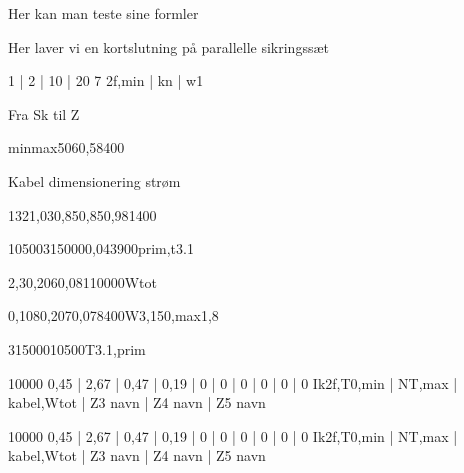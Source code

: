 \documentclass[a4paper,oneside,10pt,danish]{report}
\begin{document}
Her kan man teste sine formler

 
 Her laver vi en kortslutning på parallelle sikringssæt
	\begin{LV-Ik2f,parSikr-kA}
		{ 1 | 2 | 10 | 20 }
		{7}
		{2f,min | kn | w1}
	\end{LV-Ik2f,parSikr-kA} 
 
 
Fra Sk til Z
\begin{FraSkTilZ}{min}{max}{50}{6}{0,58}{400}
\end{FraSkTilZ}

Kabel dimensionering strøm
\begin{Iz,min}{132}{1,03}{0,85}{0,85}{0,98}{1}{400}
\end{Iz,min}

\begin{Ztrafo}{10500}{315000}{0,04}{3900}{prim,t3.1}
\end{Ztrafo}

\begin{Zkabel}{2,3}{0,206}{0,081}{10000}{Wtot}
\end{Zkabel}
\begin{Zkabel-max}{0,108}{0,207}{0,078}{400}{W3,150,max}{1,8}
\end{Zkabel-max}



\begin{TrafoFuldlast}{315000}{10500}{T3.1,prim}
\end{TrafoFuldlast}

\begin{HV-ZtilIk2f}{10000}{ 0,45 | 2,67 | 0,47 | 0,19 | 0 | 0 | 0 | 0 | 0 | 0 }{Ik2f,T0,min | NT,max | kabel,Wtot | Z3 navn | Z4 navn | Z5 navn}
\end{HV-ZtilIk2f}

\begin{HV-ZtilIk3f}{10000}{ 0,45 | 2,67 | 0,47 | 0,19 | 0 | 0 | 0 | 0 | 0 | 0 }{Ik2f,T0,min | NT,max | kabel,Wtot | Z3 navn | Z4 navn | Z5 navn}
\end{HV-ZtilIk3f}
\end{document}
